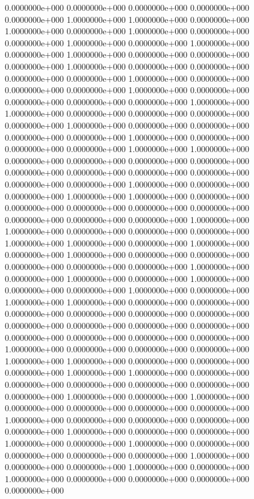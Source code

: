   0.0000000e+000  0.0000000e+000  0.0000000e+000  0.0000000e+000  0.0000000e+000
  1.0000000e+000  1.0000000e+000  0.0000000e+000  1.0000000e+000  0.0000000e+000
  1.0000000e+000  0.0000000e+000  0.0000000e+000  1.0000000e+000  0.0000000e+000
  1.0000000e+000  0.0000000e+000  1.0000000e+000  0.0000000e+000  0.0000000e+000
  0.0000000e+000  1.0000000e+000  0.0000000e+000  0.0000000e+000  0.0000000e+000
  0.0000000e+000  1.0000000e+000  0.0000000e+000  0.0000000e+000  0.0000000e+000
  1.0000000e+000  0.0000000e+000  0.0000000e+000  0.0000000e+000  0.0000000e+000
  1.0000000e+000  1.0000000e+000  0.0000000e+000  0.0000000e+000  0.0000000e+000
  0.0000000e+000  1.0000000e+000  0.0000000e+000  0.0000000e+000  0.0000000e+000
  0.0000000e+000  1.0000000e+000  0.0000000e+000  0.0000000e+000  0.0000000e+000
  1.0000000e+000  1.0000000e+000  0.0000000e+000  0.0000000e+000  0.0000000e+000
  0.0000000e+000  0.0000000e+000  0.0000000e+000  0.0000000e+000  0.0000000e+000
  0.0000000e+000  0.0000000e+000  1.0000000e+000  0.0000000e+000  0.0000000e+000
  1.0000000e+000  1.0000000e+000  0.0000000e+000  0.0000000e+000  0.0000000e+000
  0.0000000e+000  0.0000000e+000  0.0000000e+000  0.0000000e+000  0.0000000e+000
  1.0000000e+000  1.0000000e+000  0.0000000e+000  0.0000000e+000  0.0000000e+000
  1.0000000e+000  1.0000000e+000  0.0000000e+000  1.0000000e+000  0.0000000e+000
  1.0000000e+000  0.0000000e+000  0.0000000e+000  0.0000000e+000  0.0000000e+000
  0.0000000e+000  1.0000000e+000  0.0000000e+000  1.0000000e+000  0.0000000e+000
  1.0000000e+000  0.0000000e+000  0.0000000e+000  1.0000000e+000  0.0000000e+000
  1.0000000e+000  1.0000000e+000  0.0000000e+000  0.0000000e+000  0.0000000e+000
  0.0000000e+000  0.0000000e+000  0.0000000e+000  0.0000000e+000  0.0000000e+000
  0.0000000e+000  0.0000000e+000  0.0000000e+000  0.0000000e+000  0.0000000e+000
  0.0000000e+000  1.0000000e+000  0.0000000e+000  0.0000000e+000  0.0000000e+000
  1.0000000e+000  1.0000000e+000  0.0000000e+000  0.0000000e+000  0.0000000e+000
  1.0000000e+000  1.0000000e+000  0.0000000e+000  0.0000000e+000  0.0000000e+000
  0.0000000e+000  0.0000000e+000  0.0000000e+000  1.0000000e+000  0.0000000e+000
  1.0000000e+000  0.0000000e+000  0.0000000e+000  0.0000000e+000  0.0000000e+000
  1.0000000e+000  0.0000000e+000  0.0000000e+000  0.0000000e+000  0.0000000e+000
  1.0000000e+000  0.0000000e+000  0.0000000e+000  1.0000000e+000  0.0000000e+000
  1.0000000e+000  0.0000000e+000  0.0000000e+000  0.0000000e+000  0.0000000e+000
  1.0000000e+000  0.0000000e+000  0.0000000e+000  1.0000000e+000  0.0000000e+000
  1.0000000e+000  0.0000000e+000  0.0000000e+000  0.0000000e+000  0.0000000e+000
